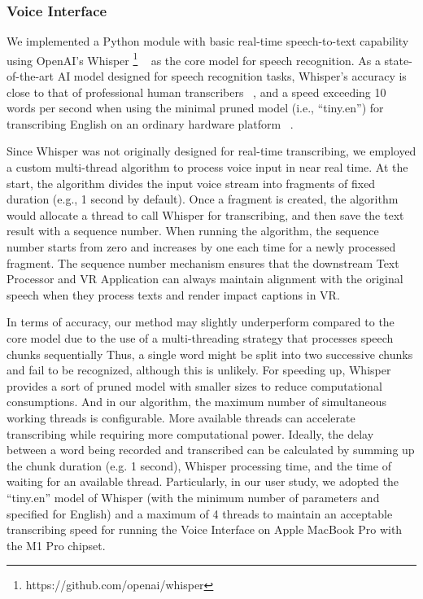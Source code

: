 \subsubsection{Voice Interface}
\label{sec_voice_interface}
We implemented a Python module with basic real-time speech-to-text capability using OpenAI's Whisper \footnote{https://github.com/openai/whisper} ~\cite{radford2023robust} as the core model for speech recognition.
As a state-of-the-art AI model designed for speech recognition tasks, Whisper's accuracy is close to that of professional human transcribers ~\cite{radford2023robust}, and a speed exceeding 10 words per second when using the minimal pruned model (i.e., ``tiny.en'') for transcribing English on an ordinary hardware platform ~\cite{haz2023study}.

Since Whisper was not originally designed for real-time transcribing, we employed a custom multi-thread algorithm to process voice input in near real time.
At the start, the algorithm divides the input voice stream into fragments of fixed duration (e.g., 1 second by default). Once a fragment is created, the algorithm would allocate a thread to call Whisper for transcribing, and then save the text result with a sequence number. 
When running the algorithm, the sequence number starts from zero and increases by one each time for a newly processed fragment. The sequence number mechanism ensures that the downstream Text Processor and VR Application can always maintain alignment with the original speech when they process texts and render impact captions in VR.

In terms of accuracy, our method may slightly underperform compared to the core model due to the use of a multi-threading strategy that processes speech chunks sequentially
Thus, a single word might be split into two successive chunks and fail to be recognized, although this is unlikely.
For speeding up, Whisper provides a sort of pruned model with smaller sizes to reduce computational consumptions. 
And in our algorithm, the maximum number of simultaneous working threads is configurable. More available threads can accelerate transcribing while requiring more computational power.
Ideally, the delay between a word being recorded and transcribed can be calculated by summing up the chunk duration (e.g. 1 second), Whisper processing time, and the time of waiting for an available thread. 
Particularly, in our user study, we adopted the ``tiny.en'' model of Whisper (with the minimum number of parameters and specified for English) and a maximum of 4 threads to maintain an acceptable transcribing speed for running the Voice Interface on Apple MacBook Pro with the M1 Pro chipset.

